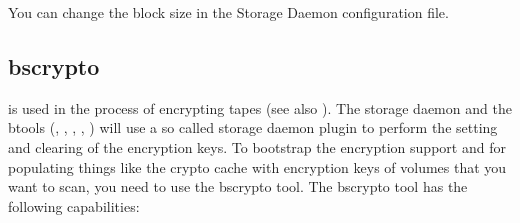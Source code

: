 You can change the block size in the Storage Daemon configuration file.

\subsection{bscrypto}
\label{bscrypto}

 is used in the process of encrypting tapes (see also ). The storage daemon and the btools (, , , , ) will use a so called storage daemon plugin to perform the setting and clearing of the encryption keys. To bootstrap the encryption support and for populating things like the crypto cache with encryption keys of volumes that you want to scan, you need to use the bscrypto tool.
The bscrypto tool has the following capabilities:

